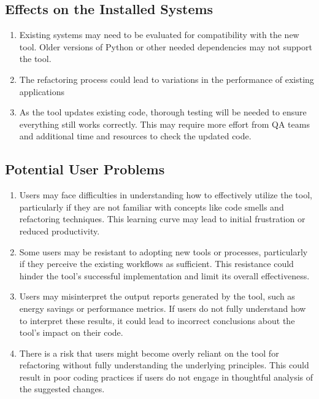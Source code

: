 \documentclass[12pt]{article}
\begin{document}
\subsection{Effects on the Installed Systems}
\begin{enumerate}
  \item Existing systems may need to be evaluated for compatibility
    with the new tool. Older versions of Python or other needed
    dependencies may not support the tool.
  \item The refactoring process could lead to variations in the
    performance of existing applications
  \item As the tool updates existing code, thorough testing will be
    needed to ensure everything still works correctly. This may
    require more effort from QA teams and additional time and
    resources to check the updated code.
\end{enumerate}

\subsection{Potential User Problems}
\begin{enumerate}
  \item Users may face difficulties in understanding how to
    effectively utilize the tool, particularly if they are not
    familiar with concepts like code smells and refactoring
    techniques. This learning curve may lead to initial frustration
    or reduced productivity.
  \item Some users may be resistant to adopting new tools or
    processes, particularly if they perceive the existing workflows
    as sufficient. This resistance could hinder the tool's successful
    implementation and limit its overall effectiveness.
  \item Users may misinterpret the output reports generated by the
    tool, such as energy savings or performance metrics. If users do
    not fully understand how to interpret these results, it could
    lead to incorrect conclusions about the tool's impact on their code.
  \item There is a risk that users might become overly reliant on the
    tool for refactoring without fully understanding the underlying
    principles. This could result in poor coding practices if users
    do not engage in thoughtful analysis of the suggested changes.
\end{enumerate}
\end{document}

